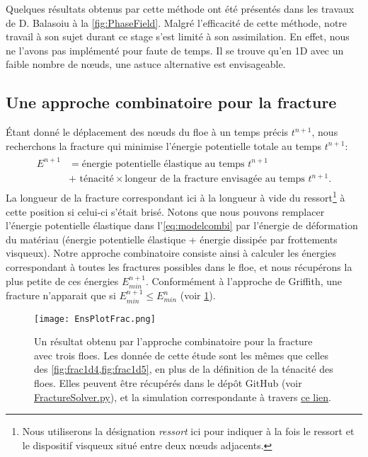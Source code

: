 Quelques résultats obtenus par cette méthode ont été présentés dans les travaux de D. Balasoiu à la \cref{fig:PhaseField}. Malgré l'efficacité de cette méthode, notre travail à son sujet durant ce stage s'est limité à son assimilation. En effet, nous ne l'avons pas implémenté pour faute de temps. Il se trouve qu'en 1D avec un faible nombre de n\oe{}uds, une astuce alternative est envisageable. 




\subsection{Une approche combinatoire pour la fracture}
\label{subsubsec:approchecombi}


Étant donné le déplacement des n\oe{}uds du floe à un temps précis $t^{n+1}$, nous recherchons la fracture qui minimise l'énergie potentielle totale au temps $t^{n+1}$:
\begin{align} \label{eq:modelcombi}
    \boxed{
    \begin{array}{rll}
    E^{n+1} & = \text{énergie potentielle élastique au temps } t^{n+1}  \\
    & + \text{ ténacité}\times \text{longeur de la fracture envisagée au temps }t^{n+1}.  
    \end{array}
    }
\end{align}
La longueur de la fracture correspondant ici à la longueur à vide du ressort\footnote{Nous utiliserons la désignation \emph{ressort} ici pour indiquer à la fois le ressort et le dispositif visqueux situé entre deux n\oe{}uds adjacents.} à cette position si celui-ci s'était brisé. Notons que nous pouvons remplacer l'énergie potentielle élastique dans l'\cref{eq:modelcombi} par l'énergie de déformation du matériau (énergie potentielle élastique + énergie dissipée par frottements visqueux). Notre approche combinatoire consiste ainsi à calculer les énergies correspondant à toutes les fractures possibles dans le floe, et nous récupérons la plus petite de ces énergies $E^{n+1}_{min}$. Conformément à l'approche de Griffith, une fracture n'apparait que si $E^{n+1}_{min}\leq E^{n}_{min}$ (voir \cref{fig:fracture1d6}). 
\begin{figure}[!h]
    \centering
    \texttt{[image: EnsPlotFrac.png]}
    \caption{Un résultat obtenu par l'approche combinatoire pour la fracture avec trois floes. Les donnée de cette étude sont les mêmes que celles des \cref{fig:frac1d4,fig:frac1d5}, en plus de la définition de la ténacité des floes. Elles peuvent être récupérés dans le dépôt GitHub (voir \href{https://github.com/desmond-rn/ice-floes/blob/master/code/simu1D/FractureSolver.py}{FractureSolver.py}), et la simulation correspondante à travers \href{https://seafile.unistra.fr/f/e08c4b4af6e244308867/}{ce lien}.}
    \label{fig:fracture1d6}
\end{figure}

